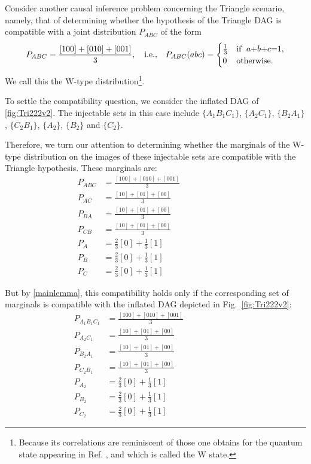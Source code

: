 Consider another causal inference problem concerning the Triangle scenario, namely, that of determining whether the hypothesis of the Triangle DAG is compatible with a joint distribution 
$P_{A B C}$ of the form
\begin{align}\label{eq:wdistribution1}
P_{A B C}=\frac{[100]+[010]+[001]}{3},\quad\text{i.e.,}\quad P_{A B C}(a b c)=\begin{cases}\tfrac{1}{3}&\text{if }\; a\mathord{+}b\mathord{+}c\mathord{=} 1, \\ 0&\text{otherwise}.\end{cases}
\end{align}
We call this the W-type distribution\footnote{Because its correlations are reminiscent of those one obtains for the quantum state appearing in Ref. \cite{3Qubits2Ways}, and which is called the W state.}. 

To settle the compatibility question, we consider the inflated DAG of \cref{fig:Tri222v2}.  The injectable sets in this case include $\{A_1 B_1 C_1\}$, $\{A_2 C_1\}$, $\{B_2 A_1\}$, $\{C_2 B_1\}$,  $\{A_2\}$, $\{B_2\}$ and $\{C_2\}$. 

Therefore, we turn our attention to determining whether the marginals of the W-type distribution on the images of these injectable sets are compatible with the Triangle hypothesis.  These marginals are:
\begin{align}
P_{A B C}&= \frac{[100]+[010]+[001]}{3} &&&&&&&&\label{V4}\\
P_{A C}&= \frac{[10]+[01]+[00]}{3} &&&&&&&&\label{V1}\\
P_{B A}&=\frac{[10]+[01]+[00]}{3} &&&&&&&&\label{V2}\\
P_{C B}&= \frac{[10]+[01]+[00]}{3} &&&&&&&&\label{V3}\\
P_{A}&= \frac{2}{3}[0] + \frac{1}{3}[1] &&&&&&&&\label{V5}\\
P_{B}&=\frac{2}{3}[0] + \frac{1}{3}[1]  &&&&&&&&\label{V6}\\
P_{C}&= \frac{2}{3}[0] + \frac{1}{3}[1]  &&&&&&&&\label{V7}
\end{align}

But by \cref{mainlemma}, this compatibility holds only if the corresponding set of marginals is compatible with the inflated DAG depicted in Fig.~\ref{fig:Tri222v2}:
\begin{align}
P_{A_1 B_1 C_1}&= \frac{[100]+[010]+[001]}{3} &&&&&&&&\label{W4}\\
P_{A_2 C_1}&= \frac{[10]+[01]+[00]}{3} &&&&&&&&\label{W1}\\
P_{B_2 A_1}&=\frac{[10]+[01]+[00]}{3} &&&&&&&&\label{W2}\\
P_{C_2 B_1}&= \frac{[10]+[01]+[00]}{3} &&&&&&&&\label{W3}\\
P_{A_2}&= \frac{2}{3}[0] + \frac{1}{3}[1] &&&&&&&&\label{W5}\\
P_{B_2}&=\frac{2}{3}[0] + \frac{1}{3}[1]  &&&&&&&&\label{W6}\\
P_{C_2}&= \frac{2}{3}[0] + \frac{1}{3}[1]  &&&&&&&&\label{W7}
\end{align}

